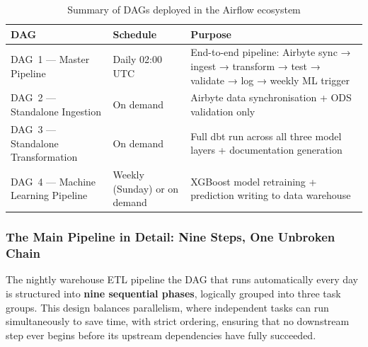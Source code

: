 \begin{table}[H]
\centering
\small
\renewcommand{\arraystretch}{1.5}
\caption{Summary of DAGs deployed in the Airflow ecosystem}
\label{tab:dag_summary}
\begin{tabular}{|p{4.2cm}|p{2.5cm}|p{7.3cm}|}
\hline
\rowcolor{blue!15}
\textbf{DAG} & \textbf{Schedule} & \textbf{Purpose} \\
\hline
DAG~1 --- Master Pipeline & Daily 02:00 UTC & End-to-end pipeline: Airbyte sync → ingest → transform → test → validate → log → weekly ML trigger \\
\hline
DAG~2 --- Standalone Ingestion & On demand & Airbyte data synchronisation + ODS validation only \\
\hline
DAG~3 --- Standalone Transformation & On demand & Full dbt run across all three model layers + documentation generation \\
\hline
DAG~4 --- Machine Learning Pipeline & Weekly (Sunday) or on demand & XGBoost model retraining + prediction writing to data warehouse \\
\hline
\end{tabular}
\end{table}

\subsubsection{The Main Pipeline in Detail: Nine Steps, One Unbroken Chain}

The nightly warehouse ETL pipeline the DAG that runs automatically every day is
structured into \textbf{nine sequential phases}, logically grouped into three task
groups. This design balances parallelism, where independent tasks can run simultaneously
to save time, with strict ordering, ensuring that no downstream step ever begins before
its upstream dependencies have fully succeeded.


